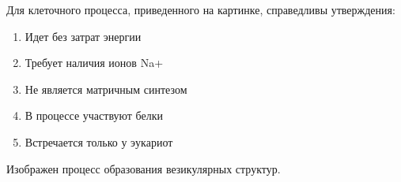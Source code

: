 
Для клеточного процесса, приведенного на картинке, справедливы утверждения:


\begin{enumerate}
    \item Идет без затрат энергии 
    \item Требует наличия ионов Na+ 
    \item Не является матричным синтезом  
    \item В процессе участвуют белки 
    \item Встречается только у эукариот
\end{enumerate}


\explanationSection

Изображен процесс образования везикулярных структур.


